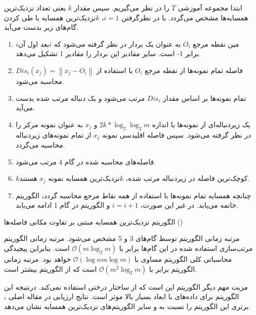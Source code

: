 \begin{algorithm}[!t]
\begin{steps}
	
	ابتدا مجموعه آموزشی $T$ را در نظر می‌گیریم. سپس مقدار $k$ یعنی تعداد نزدیک‌ترین همسایه‌ها مشخص می‌گردد. با در نظرگرفتن $i=1$،  $k$نزدیک‌ترین همسایه با طی کردن گام‌های زیر بدست می‌آید.
	
	\begin{enumerate}
		\item  $i$مین نقطه مرجع  $O_{i}$ به عنوان یک بردار در نظر گرفته می‌شود که   $i$بعد اول آن برابر 1- است. سایر مقادیر این بردار را مقادیر 1 تشکیل می‌دهد.
		\item 	فاصله تمام نمونه‌ها از نقطه مرجع $O_{i}$  با استفاده از $Dis_{i}(x_{j})=\left\|x_{j}-O_{i}\right\|$  محاسبه می‌شود.
		\item 	تمام نمونه‌ها بر اساس مقدار $Dis_{i}$  مرتب می‌شود و یک دنباله مرتب شده بدست می‌آید.
		\item 	یک زیردنباله‌ای از نمونه‌ها با اندازه  $2k*{{\log }_{2}}{{\log }_{2}}m$ و  $x_{j}$ به عنوان نمونه مرکز را در نظر گرفته می‌شود. سپس فاصله اقلیدسی نمونه  $x_{j}$ از تمام نمونه‌های زیردنباله محاسبه می‌گردد.
		\item فاصله‌های محاسبه شده در گام 4 مرتب می‌شود.
		\item  $k$کوچک‌ترین فاصله در زیردنباله مرتب شده،  $k$نزدیک‌ترین همسایه نمونه  $x_{j}$ هستند.
		\item چنانچه همسایه تمام نمونه‌ها با استفاده از همه نقاط مرجع محاسبه گردد، الگوریتم خاتمه می‌یابد. در غیر این صورت،  $i=i+1$ و الگوریتم در گام 1 ادامه می‌یابد.
	\end{enumerate}

\end{steps}
\caption{الگوریتم نزدیک‌ترین همسایه مبتنی بر تفاوت مکانی فاصله‌ها ()}
\label{algo:LDMDBA}
\end{algorithm}

مرتبه زمانی الگوریتم  توسط گام‌های 3 و 5 مشخص می‌شود. مرتبه زمانی الگوریتم مرتب‌سازی استفاده شده در این گام‌ها برابر با   $\mathcal{O}(m{{\log }_{2}}m)$ است. بنابراین پیچیدگی محاسباتی کلی الگوریتم  مساوی با  $\mathcal{O}(\log nm\log m)$ خواهد بود. مرتبه زمانی الگوریتم  برابر با  $\mathcal{O}({{m}^{2}}{{\log }_{2}}m)$ است که از الگوریتم  بیشتر است.

مزیت مهم دیگر الگوریتم  این است که از ساختار درختی استفاده نمی‌کند. درنتیجه این الگوریتم برای داده‌های با ابعاد بسیار بالا موثر است. نتایج ارزیابی در مقاله اصلی \cite{xia2015}، برتری این الگوریتم را نسبت به  و سایر الگوریتم‌های نزدیک‌ترین همسایه نشان می‌دهد.

